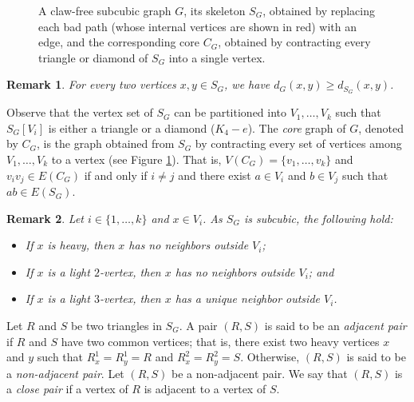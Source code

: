 \documentclass[12pt, oneside]{scrartcl}
\newtheorem{remark}{Remark}%
\begin{document}
\begin{figure}[h!]
\caption{A claw-free subcubic graph \(G\), its skeleton \(S_G\), obtained by replacing each bad path (whose internal vertices are shown in red) with an edge, and the corresponding core \(C_G\), obtained by contracting every triangle or diamond of \(S_G\) into a single vertex.}\label{Figure_example}
\end{figure}


\begin{remark}\label{r1}
    For every two vertices $x,y\in S_G$, we have $d_{G}(x,y)\geq d_{S_G}(x,y)$.
\end{remark}

Observe that the vertex set of $S_G$ can be partitioned into $V_1,\dots ,V_k$ such that $S_G[V_i]$ is either a triangle or a diamond ($K_4-e$). The \textit{core} graph of $G$, denoted by $C_G$, is the graph obtained from $S_G$ by contracting every set of vertices among $V_1,\dots ,V_k$ to a vertex (see Figure \ref{Figure_example}). That is, $V(C_G)=\{v_1,\dots ,v_k\}$ and $v_iv_j\in E(C_G)$ if and only if $i\neq j$ and there exist $a\in V_i$ and $b\in V_j$ such that $ab\in E(S_G)$.

\begin{remark}\label{r2}
    Let $i\in \{1,\dots ,k\}$ and $x\in V_i$. As $S_G$ is subcubic, the following hold:\begin{itemize}
        \item[(i)] If $x$ is heavy, then $x$ has no neighbors outside $V_i$;
        \item[(ii)] If $x$ is a light $2$-vertex, then $x$ has no neighbors outside $V_i$; and
        \item[(iii)] If $x$ is a light $3$-vertex, then $x$ has a unique neighbor outside $V_i$.
    \end{itemize}
\end{remark}

Let $R$ and $S$ be two triangles in $S_G$. A pair $(R,S)$ is said to be an \textit{adjacent pair} if $R$ and $S$ have two common vertices; that is, there exist two heavy vertices $x$ and $y$ such that $R_x^1=R_y^1=R$ and $R_x^2=R_y^2=S$. Otherwise, $(R,S)$ is said to be a \emph{non-adjacent pair}. Let $(R,S)$ be a non-adjacent pair. We say that $(R,S)$ is a \emph{close pair} if a vertex of $R$ is adjacent to a vertex of $S$.
\end{document}
